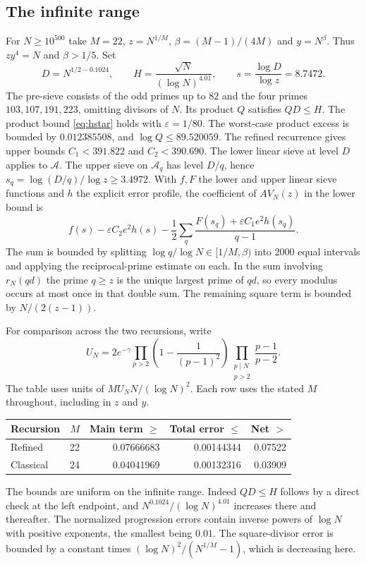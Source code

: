 \documentclass[11pt]{article}
\theoremstyle{remark}\newtheorem{remark}[theorem]{Remark}
\begin{document}
\subsection{The infinite range}
For $N\ge10^{500}$ take $M=22$, $z=N^{1/M}$,
$\beta=(M-1)/(4M)$ and $y=N^\beta$. Thus $zy^4=N$ and
$\beta>1/5$. Set
\[
 D=N^{1/2-0.1024},\qquad H=\frac{\sqrt N}{(\log N)^{4.01}},
 \qquad s=\frac{\log D}{\log z}=8.7472 .
\]
The pre-sieve consists of the odd primes up to $82$ and the four primes
$103,107,191,223$, omitting divisors of $N$. Its product $Q$
satisfies $QD\le H$. The product bound \eqref{eq:hstar} holds with
$\varepsilon=1/80$. The worst-case product excess is bounded by $0.012385508$, and $\log Q\le89.520059$. The refined recurrence gives upper bounds $C_1<391.822$ and $C_2<390.690$. The lower linear sieve at level $D$ applies to
$\mathcal A$. The upper sieve on $\mathcal A_q$ has level $D/q$, hence
$s_q=\log(D/q)/\log z\ge3.4972$. With $f,F$ the lower and upper
linear sieve functions and $h$ the explicit error profile, the coefficient of $A V_N(z)$ in the lower bound is
\[
 f(s)-\varepsilon C_2e^2h(s)
 -\frac12\sum_q
 \frac{F(s_q)+\varepsilon C_1e^2h(s_q)}{q-1}
 .
\]
The sum is bounded by splitting $\log q/\log N\in[1/M,\beta)$ into
$2000$ equal intervals and applying the reciprocal-prime estimate
on each. In the sum involving $r_N(qd)$ the prime $q\ge z$ is the unique largest prime of $qd$, so every modulus occurs
at most once in that double sum. The remaining square term is bounded
by $N/(2(z-1))$.

For comparison across the two recursions, write
\[
 U_N=2e^{-\gamma}\!
 \prod_{p>2}\left(1-\frac1{(p-1)^2}\right)
 \prod_{\substack{p\mid N\\ p>2}}\frac{p-1}{p-2}.
\]
The table uses units of $M U_N N/(\log N)^2$. Each row uses the
stated $M$ throughout, including in $z$ and $y$.
\begin{center}
\begin{tabular}{lrrrr}
\hline
Recursion & $M$ & Main term $\ge$ & Total error $\le$ & Net $>$\\
\hline
Refined & 22 & 0.07666683 & 0.00144344 & 0.07522\\
Classical & 24 & 0.04041969 & 0.00132316 & 0.03909\\
\hline
\end{tabular}
\end{center}
The bounds are uniform on the infinite range. Indeed $QD\le H$ follows
by a direct check at the left endpoint, and $N^{0.1024}/(\log N)^{4.01}$ increases there
and thereafter. The normalized progression errors contain inverse powers
of $\log N$ with positive exponents, the smallest being $0.01$.
The square-divisor error is bounded by a constant times
$(\log N)^2/(N^{1/M}-1)$, which is decreasing here.
\end{document}
